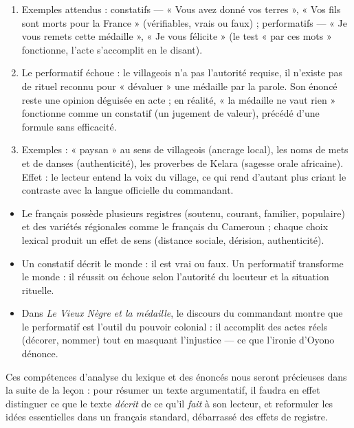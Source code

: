 \documentclass[11pt]{article}
\newcommand{\cle}[1]{{\popxbold\color{popdark}#1}}
\begin{document}
\begin{corrige}
\begin{enumerate}
\item Exemples attendus : constatifs — « Vous avez donné vos terres », « Vos fils sont morts pour la France » (vérifiables, vrais ou faux) ; performatifs — « Je vous remets cette médaille », « Je vous félicite » (le test « par ces mots » fonctionne, l'acte s'accomplit en le disant).
\item Le performatif échoue : le villageois n'a pas l'autorité requise, il n'existe pas de rituel reconnu pour « dévaluer » une médaille par la parole. Son énoncé reste une opinion déguisée en acte ; en réalité, « la médaille ne vaut rien » fonctionne comme un constatif (un jugement de valeur), précédé d'une formule sans efficacité.
\item Exemples : « paysan » au sens de villageois (ancrage local), les noms de mets et de danses (authenticité), les proverbes de Kelara (sagesse orale africaine). Effet : le lecteur entend la voix du village, ce qui rend d'autant plus criant le contraste avec la langue officielle du commandant.
\end{enumerate}
\end{corrige}

\begin{aretenir}
\begin{itemize}
\item Le français possède plusieurs \cle{registres} (soutenu, courant, familier, populaire) et des \cle{variétés régionales} comme le français du Cameroun ; chaque choix lexical produit un effet de sens (distance sociale, dérision, authenticité).
\item Un \cle{constatif} décrit le monde : il est vrai ou faux. Un \cle{performatif} transforme le monde : il réussit ou échoue selon l'autorité du locuteur et la situation rituelle.
\item Dans \emph{Le Vieux Nègre et la médaille}, le discours du commandant montre que le performatif est l'outil du pouvoir colonial : il accomplit des actes réels (décorer, nommer) tout en masquant l'injustice — ce que l'ironie d'Oyono dénonce.
\end{itemize}
Ces compétences d'analyse du lexique et des énoncés nous seront précieuses dans la suite de la leçon : pour résumer un texte argumentatif, il faudra en effet distinguer ce que le texte \emph{décrit} de ce qu'il \emph{fait} à son lecteur, et reformuler les idées essentielles dans un français standard, débarrassé des effets de registre.
\end{aretenir}
\end{document}
